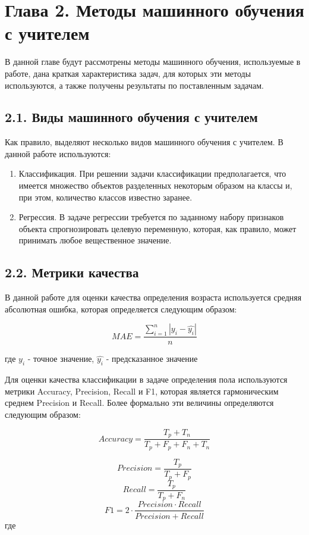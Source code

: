 \section{Глава 2. Методы машинного обучения с учителем}

В данной главе будут рассмотрены методы машинного обучения, используемые в работе, дана краткая характеристика задач, для которых эти методы используются, а также получены результаты по поставленным задачам.

\subsection{2.1. Виды машинного обучения с учителем}
Как правило, выделяют несколько видов машинного обучения с учителем. В данной работе используются:
\begin{enumerate}
\item Классификация. При решении задачи классификации предполагается, что имеется множество объектов разделенных некоторым образом на классы и, при этом, количество классов известно заранее.
\item Регрессия. В задаче регрессии требуется по заданному набору признаков объекта спрогнозировать целевую переменную, которая, как правило, может принимать любое вещественное значение.
\end{enumerate}

\subsection{2.2. Метрики качества}

В данной работе для оценки качества определения возраста используется средняя абсолютная ошибка, которая определяется следующим образом:

$$
	MAE = \frac{\sum_{i=1}^{n} |y_i - \hat{y_i}|}{n}
$$

где $y_i$ - точное значение, $\hat{y_i}$ - предсказанное значение

Для оценки качества классификации в задаче определения пола используются метрики Accuracy, Precision, Recall и F1, которая является гармоническим среднем Precision и Recall. Более формально эти величины определяются следующим образом:

$$
 Accuracy= \frac{T_p + T_n}{T_p + F_p + F_n + T_n}
$$

$$
 Precision = \frac{T_p}{T_p + F_p}
$$
$$
Recall = \frac{T_p}{T_p + F_n}
$$
$$
	F1 = 2 \cdot \frac{Precision \cdot Recall}{Precision + Recall}
$$
где 

